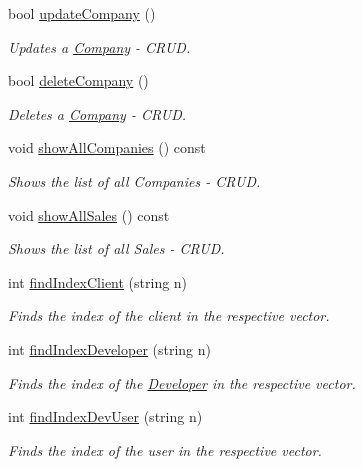 \begin{DoxyCompactItemize}
bool \hyperlink{class_app_store_a121e2731fa450585a9bf32cf97ede37b}{update\-Company} ()
\begin{DoxyCompactList}\small\item\em Updates a \hyperlink{class_company}{Company} -\/ C\-R\-U\-D. \end{DoxyCompactList}\item 
bool \hyperlink{class_app_store_a570764c37cc75a230f9c1efced300bc7}{delete\-Company} ()
\begin{DoxyCompactList}\small\item\em Deletes a \hyperlink{class_company}{Company} -\/ C\-R\-U\-D. \end{DoxyCompactList}\item 
void \hyperlink{class_app_store_ade086a2b1b96e6febb1bbe27d09311fc}{show\-All\-Companies} () const 
\begin{DoxyCompactList}\small\item\em Shows the list of all Companies -\/ C\-R\-U\-D. \end{DoxyCompactList}\item 
void \hyperlink{class_app_store_a1eab2532969e746083c95bf9343a88e2}{show\-All\-Sales} () const 
\begin{DoxyCompactList}\small\item\em Shows the list of all Sales -\/ C\-R\-U\-D. \end{DoxyCompactList}\item 
int \hyperlink{class_app_store_a2d33aa41da255cd2ad4732b5a908a71f}{find\-Index\-Client} (string n)
\begin{DoxyCompactList}\small\item\em Finds the index of the client in the respective vector. \end{DoxyCompactList}\item 
int \hyperlink{class_app_store_af2866f0d914b6ca1f0eddcfb427b3115}{find\-Index\-Developer} (string n)
\begin{DoxyCompactList}\small\item\em Finds the index of the \hyperlink{class_developer}{Developer} in the respective vector. \end{DoxyCompactList}\item 
int \hyperlink{class_app_store_a566fa7131765af151e3246e99f83593b}{find\-Index\-Dev\-User} (string n)
\begin{DoxyCompactList}\small\item\em Finds the index of the user in the respective vector. \end{DoxyCompactList}\item 

\end{DoxyCompactItemize}
